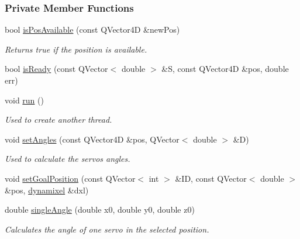 \subsubsection*{Private Member Functions}
\begin{DoxyCompactItemize}
\item 
bool \hyperlink{a00009_a6f6035054ecb8fe51bcdacae5da7cb0e}{is\+Pos\+Available} (const Q\+Vector4\+D \&new\+Pos)
\begin{DoxyCompactList}\small\item\em Returns true if the position is available. \end{DoxyCompactList}\item 
bool \hyperlink{a00009_a1d96ca800864243478463b0306ed74d7}{is\+Ready} (const Q\+Vector$<$ double $>$ \&S, const Q\+Vector4\+D \&pos, double err)
\item 
void \hyperlink{a00009_aeeb31b85abf7eb5c701853a6d25e51e0}{run} ()
\begin{DoxyCompactList}\small\item\em Used to create another thread. \end{DoxyCompactList}\item 
void \hyperlink{a00009_a61d2ed44bb73cd337aa81963cb0ef858}{set\+Angles} (const Q\+Vector4\+D \&pos, Q\+Vector$<$ double $>$ \&D)
\begin{DoxyCompactList}\small\item\em Used to calculate the servos angles. \end{DoxyCompactList}\item 
void \hyperlink{a00009_a5271acc6d57f9c8c9a92a032851ca135}{set\+Goal\+Position} (const Q\+Vector$<$ int $>$ \&I\+D, const Q\+Vector$<$ double $>$ \&pos, \hyperlink{a00004}{dynamixel} \&dxl)
\item 
double \hyperlink{a00009_add4637d917a772c4c01a43b5b66da2be}{single\+Angle} (double x0, double y0, double z0)
\begin{DoxyCompactList}\small\item\em Calculates the angle of one servo in the selected position. \end{DoxyCompactList}\end{DoxyCompactItemize}
